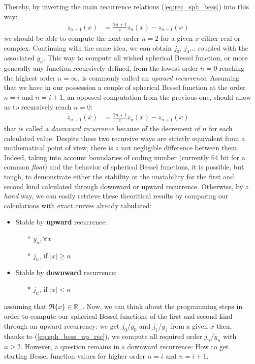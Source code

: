 \documentclass{article}
\numberwithin{equation}{section}
\begin{document}
Thereby, by inverting the main recurrence relations (\ref{eq:rec_sph_bess}) into this way:
\begin{align}\label{eq:sph_bess_up_rec}
z_{n+1}(x) &= \frac{2n+1}{x}z_{n}(x) - z_{n-1}(x)
\end{align}
we should be able to compute the next order $n=2$ for a given $x$ either real or complex. Continuing with the same idea, we can obtain $j_{3}$, $j_{4}$... coupled with the associated $y_{n}$. This way to compute all wished spherical Bessel function, or more generally any function recursively defined, from the lowest order $n=0$ reaching the highest order $n=\infty$, is commonly called an \textit{upward recurrence}. Assuming that we have in our possession a couple of spherical Bessel function at the order $n=i$ and $n=i+1$, an opposed computation from the previous one, should allow us to recursively reach $n=0$: 
\begin{align}\label{eq:sph_bess_down_rec}
z_{n-1}(x) &= \frac{2n+1}{x}z_{n}(x) - z_{n+1}(x)
\end{align}
that is called a \textit{downward recurrence} because of the decrement of $n$ for each calculated value. Despite these two recursive ways are strictly equivalent from a mathematical point of view, there is a not negligible difference between them. Indeed, taking into account boundaries of coding number (currently 64 bit for a common \textit{float}) and the behavior of spherical Bessel functions, it is possible, but tough, to demonstrate either the stability or the unstability for the first and second kind calculated through downward or upward recurrence. Otherwise, by a \textit{hand} way, we can easily retrieve these theoritical results by comparing our calculations with exact curves already tabulated:
\begin{itemize}
\item Stable by \textbf{upward} recurrence: 
\begin{itemize}
\item[*]$y_{n}, \forall x$
\item[*]$j_{n}$, if $|x| \geqslant n$
\end{itemize}
\item Stable by \textbf{downward} recurrence:
\begin{itemize}
\item[*]$j_{n}$, if $|x| < n$
\end{itemize}
\end{itemize}
assuming that $\Re\{x\} \in\mathbb{R}_{+}$. Now, we can think about the programming steps in order to compute our spherical Bessel functions of the first and second kind through an upward recurrency: we get $j_{0}$/$y_{0}$ and $j_{1}$/$y_{1}$ from a given $x$ then, thanks to (\ref{eq:sph_bess_up_rec}), we compute all required order $j_{n}$/$y_{n}$ with $n \geqslant 2$. However, a question remains in a downward recurrence: How to get starting Bessel function values for higher order $n=i$ and $n=i+1$.
\end{document}
